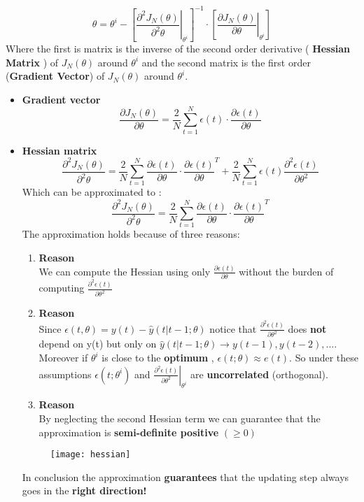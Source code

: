 \[
 \boxed{\theta  = \theta^i -  \left[\left. \frac{\partial^2{J_N(\theta)}}{\partial^2{\theta}}\right|_{\theta^i} \right]^{-1} \cdot  \left[\left. \frac{\partial{J_N(\theta)}}{\partial{\theta}}\right|_{\theta^i} \right]}
\]
Where the first is matrix is the inverse of the second order derivative ( \textbf{Hessian Matrix} ) of $J_N(\theta)$ around $\theta^i$ and the second matrix is the first order (\textbf{Gradient Vector}) of $J_N(\theta)$ around $\theta^i$.
\begin{itemize}
\item \textbf{Gradient vector}\\
 $$\frac{\partial{J_N(\theta)}}{\partial{\theta}} = \frac{2}{N}\sum\limits_{t=1}^{N}\epsilon(t) \cdot \frac{\partial{\epsilon(t)}}{\partial{\theta}}$$
 \item \textbf{Hessian matrix}\\
$$\frac{\partial^2{J_N(\theta)}}{\partial^2{\theta}}= \frac{2}{N}\sum\limits_{t=1}^{N} \frac{\partial{\epsilon(t)}}{\partial{\theta}} \cdot \frac{\partial{\epsilon(t)}}{\partial{\theta}}^T + \frac{2}{N}\sum\limits_{t=1}^{N}\epsilon(t)\frac{\partial^2{\epsilon(t)}}{\partial{\theta^2}}$$
Which can be approximated to :
$$\frac{\partial^2{J_N(\theta)}}{\partial^2{\theta}}= \frac{2}{N}\sum\limits_{t=1}^{N} \frac{\partial{\epsilon(t)}}{\partial{\theta}} \cdot \frac{\partial{\epsilon(t)}}{\partial{\theta}}^T $$
The approximation holds because of three reasons:
\begin{enumerate}
\item \textbf{Reason}\\
We can compute the Hessian using only $\frac{\partial{\epsilon(t)}}{\partial{\theta}}$ without the burden of computing $\frac{\partial^2{\epsilon(t)}}{\partial{\theta}^2} $
\item \textbf{Reason}\\
Since $\epsilon(t,\theta)= y(t) - \hat{y}(t|t-1;\theta)$ notice that $\frac{\partial^2{\epsilon(t)}}{\partial{\theta}^2} $ does \textbf{not} depend on y(t) but only on $\hat{y}(t|t-1;\theta) \to y(t-1),y(t-2),...$.\\
Moreover if $\theta^i$ is close to the \textbf{optimum} , $\epsilon(t;\theta) \approx e(t)$. So under these assumptions $\epsilon(t;\theta^i)$ and $\left. \frac{\partial^2{\epsilon(t)}}{\partial{\theta}^2} \right|_{\theta^i}$ are \textbf{uncorrelated} (orthogonal).
\item \textbf{Reason}\\
By neglecting the second Hessian term we can guarantee that the approximation is \textbf{semi-definite positive } $(\geq 0)$
\end{enumerate}
\begin{figure}[H]
 \centering
  \texttt{[image: hessian]}
\end{figure}
In conclusion the approximation \textbf{guarantees} that the updating step always goes in the \textbf{right direction!}
\end{itemize}
